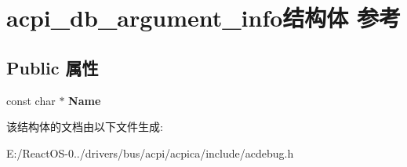 \hypertarget{structacpi__db__argument__info}{}\section{acpi\+\_\+db\+\_\+argument\+\_\+info结构体 参考}
\label{structacpi__db__argument__info}
\subsection*{Public 属性}
\begin{DoxyCompactItemize}
\item 
\mbox{\label{structacpi__db__argument__info_aeb1f34d2e80a4d1629837e9a22d3daac}} 
const char $\ast$ {\bfseries Name}
\end{DoxyCompactItemize}


该结构体的文档由以下文件生成\+:\begin{DoxyCompactItemize}
\item 
E\+:/\+React\+O\+S-\/0../drivers/bus/acpi/acpica/include/acdebug.\+h\end{DoxyCompactItemize}
